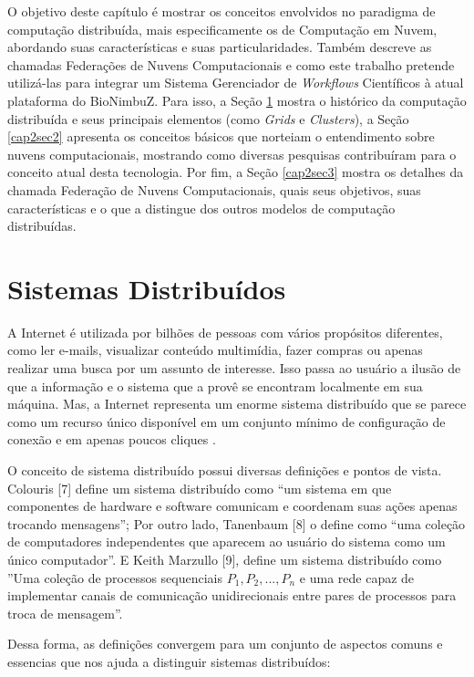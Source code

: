 O objetivo deste capítulo é mostrar os conceitos envolvidos no paradigma de computação distribuída, mais especificamente os de Computação em Nuvem, abordando suas características e suas particularidades. Também descreve as chamadas Federações de Nuvens Computacionais e como este trabalho pretende utilizá-las para integrar um Sistema Gerenciador de \textit{Workflows} Científicos à atual plataforma do BioNimbuZ. Para isso, a Seção \ref{cap2sec1} mostra o histórico da computação distribuída e seus principais elementos (como \textit{Grids} e \textit{Clusters}), a Seção \ref{cap2sec2} apresenta os conceitos básicos que norteiam o entendimento sobre nuvens computacionais, mostrando como diversas pesquisas contribuíram para o conceito atual desta tecnologia. Por fim, a Seção \ref{cap2sec3} mostra os detalhes da chamada Federação de Nuvens Computacionais, quais seus objetivos, suas características e o que a distingue dos outros modelos de computação distribuídas. 

\section{Sistemas Distribuídos} \label{cap2sec1}

A Internet é utilizada por bilhões de pessoas com vários propósitos diferentes, como ler e-mails, visualizar conteúdo multimídia, fazer compras ou apenas realizar uma busca por um assunto de interesse. Isso passa ao usuário a ilusão de que a informação e o sistema que a provê se encontram localmente em sua máquina. Mas, a Internet representa um enorme sistema distribuído que se parece como um recurso único disponível em um conjunto mínimo de configuração de conexão e em apenas poucos cliques \cite{cloud_360}.

O conceito de sistema distribuído possui diversas definições e pontos de vista. Colouris [7] define um sistema distribuído como “um sistema em que componentes de hardware e software comunicam e coordenam suas ações apenas trocando mensagens”; Por outro lado, Tanenbaum [8] o define como “uma coleção de computadores independentes que aparecem ao usuário do sistema como um único computador”. E Keith Marzullo [9], define um sistema distribuído como ''Uma coleção de processos sequenciais $P_1, P_2, ..., P_n$ e uma rede capaz de implementar canais de comunicação unidirecionais entre pares de processos para troca de mensagem''. 

Dessa forma, as definições convergem para um conjunto de aspectos comuns e essencias que nos ajuda a distinguir sistemas distribuídos: 

